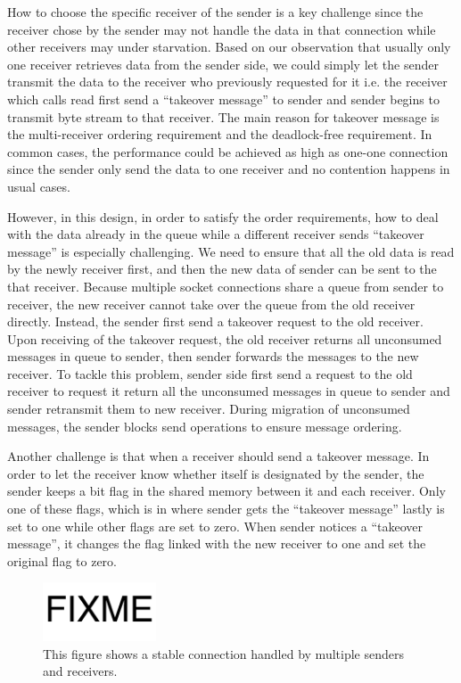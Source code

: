 How to choose the specific receiver of the sender is a key challenge since the receiver chose by the sender may not handle the data in that connection while other receivers may under starvation. Based on our observation that usually only one receiver retrieves data from the sender side, we could simply let the sender transmit the data to the receiver who previously requested for it i.e. the receiver which calls read first send a ``takeover message'' to sender and sender begins to transmit byte stream to that receiver.  The main reason for takeover message is the multi-receiver ordering requirement and the deadlock-free requirement. In common cases, the performance could be achieved as high as one-one connection since the sender only send the data to one receiver and no contention happens in usual cases.

However, in this design, in order to satisfy the order requirements, how to deal with the data already in the queue while a different receiver sends ``takeover message'' is especially challenging.  We need to ensure that all the old data is read by the newly receiver first, and then the new data of sender can be sent to the that receiver. Because multiple socket connections share a queue from sender to receiver, the new receiver cannot take over the queue from the old receiver directly. Instead, the sender first send a takeover request to the old receiver. Upon receiving of the takeover request, the old receiver returns all unconsumed messages in queue to sender, then sender forwards the messages to the new receiver. To tackle this problem, sender side first send a request to the old receiver to request it return all the unconsumed messages in queue to sender and sender retransmit them to new receiver. During migration of unconsumed messages, the sender blocks send operations to ensure message ordering.

Another challenge is that when a receiver should send a takeover message. In order to let the receiver know whether itself is designated by the sender, the sender keeps a bit flag in the shared memory between it and each receiver.  Only one of these flags, which is in where sender gets the ``takeover message'' lastly is set to one while other flags are set to zero. When sender notices a ``takeover message'', it changes the flag linked with the new receiver to one and set the original flag to zero.

\begin{figure}[t]
	\centering
	\includegraphics[width=0.3\textwidth]{images/fixme}
	\caption{This figure shows a stable connection handled by multiple senders and receivers.}
	\label{fig:fork-bipartitegraph}
\end{figure}

